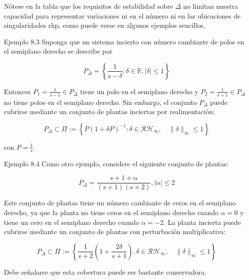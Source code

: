 Nótese en la tabla que los requisitos de estabilidad sobre $\Delta$ no limitan nuestra capacidad para representar variaciones ni en el número ni en las ubicaciones de singularidades rhp, como puede verse en algunos ejemplos sencillos.

Ejemplo 8.3 Suponga que un sistema incierto con número cambiante de polos en el semiplano derecho se describe por

$$
P_{\Delta}=\left\{\frac{1}{s-\delta}: \delta \in \mathbb{R},|\delta| \leq 1\right\}
$$

Entonces $P_{1}=\frac{1}{s-1} \in P_{\Delta}$ tiene un polo en el semiplano derecho y $P_{2}=\frac{1}{s+1} \in P_{\Delta}$ no tiene polos en el semiplano derecho. Sin embargo, el conjunto $P_{\Delta}$ puede cubrirse mediante un conjunto de plantas inciertas por realimentación:

$$
P_{\Delta} \subset \Pi:=\left\{P(1+\delta P)^{-1}: \delta \in \mathcal{R} \mathcal{H}_{\infty}, \quad\|\delta\|_{\infty} \leq 1\right\}
$$

con $P=\frac{1}{s}$.

Ejemplo 8.4 Como otro ejemplo, considere el siguiente conjunto de plantas:

$$
P_{\Delta}=\frac{s+1+\alpha}{(s+1)(s+2)},|\alpha| \leq 2
$$

Este conjunto de plantas tiene un número cambiante de ceros en el semiplano derecho, ya que la planta no tiene ceros en el semiplano derecho cuando $\alpha=0$ y tiene un cero en el semiplano derecho cuando $\alpha=-2$. La planta incierta puede cubrirse mediante un conjunto de plantas con perturbación multiplicativa:

$$
P_{\Delta} \subset \Pi:=\left\{\frac{1}{s+2}\left(1+\frac{2 \delta}{s+1}\right), \delta \in \mathcal{R} \mathcal{H}_{\infty}, \quad\|\delta\|_{\infty} \leq 1\right\}
$$

Debe señalarse que esta cobertura puede ser bastante conservadora.

